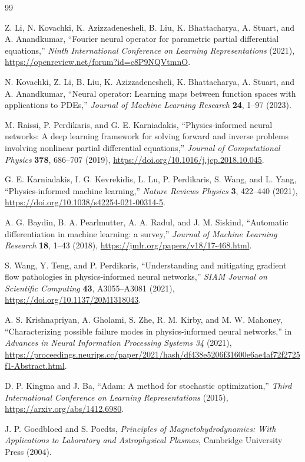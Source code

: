\documentclass[11pt]{article}
\begin{document}
\clearpage
\begin{thebibliography}{99}

Z. Li, N. Kovachki, K. Azizzadenesheli, B. Liu, K. Bhattacharya,
A. Stuart, and A. Anandkumar,
``Fourier neural operator for parametric partial differential equations,''
\emph{Ninth International Conference on Learning Representations} (2021),
\url{https://openreview.net/forum?id=c8P9NQVtmnO}.

N. Kovachki, Z. Li, B. Liu, K. Azizzadenesheli, K. Bhattacharya,
A. Stuart, and A. Anandkumar,
``Neural operator: Learning maps between function spaces with applications to PDEs,''
\emph{Journal of Machine Learning Research} \textbf{24}, 1--97 (2023).

M. Raissi, P. Perdikaris, and G. E. Karniadakis,
``Physics-informed neural networks: A deep learning framework for solving forward and inverse problems involving nonlinear partial differential equations,''
\emph{Journal of Computational Physics} \textbf{378}, 686--707 (2019),
\url{https://doi.org/10.1016/j.jcp.2018.10.045}.

G. E. Karniadakis, I. G. Kevrekidis, L. Lu, P. Perdikaris, S. Wang, and L. Yang,
``Physics-informed machine learning,''
\emph{Nature Reviews Physics} \textbf{3}, 422--440 (2021),
\url{https://doi.org/10.1038/s42254-021-00314-5}.

A. G. Baydin, B. A. Pearlmutter, A. A. Radul, and J. M. Siskind,
``Automatic differentiation in machine learning: a survey,''
\emph{Journal of Machine Learning Research} \textbf{18}, 1--43 (2018),
\url{https://jmlr.org/papers/v18/17-468.html}.

S. Wang, Y. Teng, and P. Perdikaris,
``Understanding and mitigating gradient flow pathologies in physics-informed neural networks,''
\emph{SIAM Journal on Scientific Computing} \textbf{43}, A3055--A3081 (2021),
\url{https://doi.org/10.1137/20M1318043}.

A. S. Krishnapriyan, A. Gholami, S. Zhe, R. M. Kirby, and M. W. Mahoney,
``Characterizing possible failure modes in physics-informed neural networks,''
in \emph{Advances in Neural Information Processing Systems 34} (2021),
\url{https://proceedings.neurips.cc/paper/2021/hash/df438e5206f31600e6ae4af72f2725f1-Abstract.html}.

D. P. Kingma and J. Ba,
``Adam: A method for stochastic optimization,''
\emph{Third International Conference on Learning Representations} (2015),
\url{https://arxiv.org/abs/1412.6980}.

J. P. Goedbloed and S. Poedts,
\emph{Principles of Magnetohydrodynamics: With Applications to Laboratory and Astrophysical Plasmas},
Cambridge University Press (2004).

\end{thebibliography}
\end{document}
